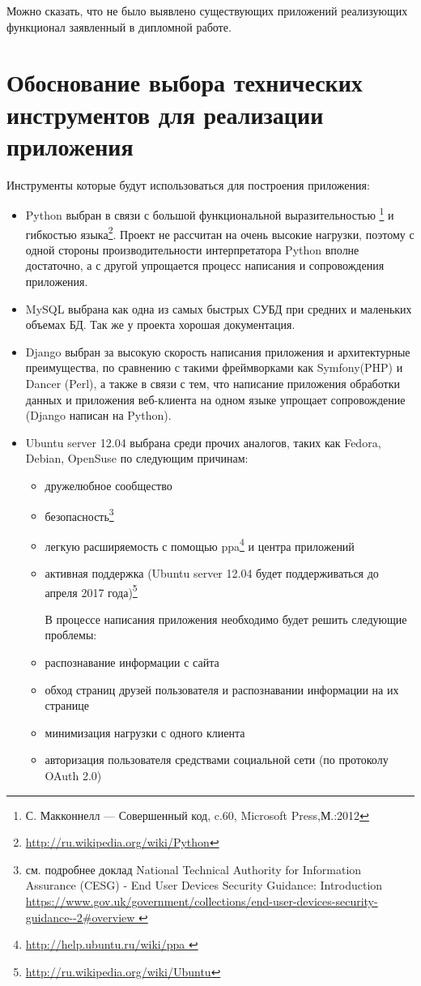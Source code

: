 Можно сказать, что не было выявлено существующих приложений реализующих функционал заявленный в дипломной работе.  

\section{Обоснование выбора технических инструментов для реализации приложения}
Инструменты которые будут использоваться для построения приложения:
\begin{itemize}
\item Python выбран в связи с большой функциональной выразительностью
\footnote{С. Макконнелл — Совершенный код, c.60, Microsoft Press,М.:2012} 
и гибкостью языка\footnote{\url{http://ru.wikipedia.org/wiki/Python}}. Проект не рассчитан на очень высокие нагрузки, поэтому с одной стороны производительности интерпретатора Python вполне достаточно, а с другой упрощается процесс написания и сопровождения приложения. \\
\item MySQL выбрана как одна из самых быстрых СУБД при средних и маленьких объемах БД. Так же у проекта хорошая документация.\\
\item Django выбран за высокую скорость написания приложения и архитектурные преимущества, по сравнению с такими фреймворками как Symfony(PHP) и Dancer (Perl), а также в связи с тем, что написание приложения обработки данных и приложения веб-клиента на одном языке упрощает сопровождение (Django написан на Python).\\
\item Ubuntu server 12.04 выбрана среди прочих аналогов, таких как Fedora, Debian, OpenSuse по следующим причинам:\\
	\begin{itemize}
	\item дружелюбное сообщество
	\item безопасность\footnote{см. подробнее доклад National Technical Authority for Information Assurance (CESG) - End User Devices Security Guidance: Introduction   \url{https://www.gov.uk/government/collections/end-user-devices-security-guidance--2\#overview }}
	\item легкую расширяемость с помощью ppa\footnote{\url{http://help.ubuntu.ru/wiki/ppa }}
	 и центра приложений
	\item активная поддержка (Ubuntu server 12.04 будет поддерживаться до апреля 2017 года)\footnote{\url{http://ru.wikipedia.org/wiki/Ubuntu}}
	
	В процессе написания приложения необходимо будет решить следующие проблемы:
	\item распознавание информации с сайта
	\item обход страниц друзей пользователя и распознавании информации на их странице
	\item минимизация нагрузки с одного клиента
	\item авторизация пользователя средствами социальной сети (по протоколу OAuth 2.0)
	
	\end{itemize}
\end{itemize}
